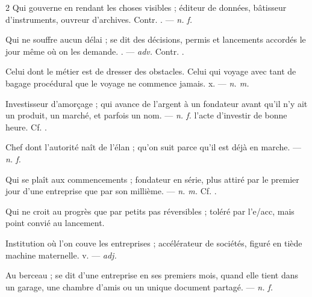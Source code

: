 \begin{multicols}{2}
 Qui gouverne en rendant les choses visibles ; éditeur de données, bâtisseur d'instruments, ouvreur d'archives. Contr. . —  \textit{n. f.}

 Qui ne souffre aucun délai ; se dit des décisions, permis et lancements accordés le jour même où on les demande. . —  \textit{adv.} Contr. .

  Celui dont le métier est de dresser des obstacles.  Celui qui voyage avec tant de bagage procédural que le voyage ne commence jamais.   x. —  \textit{n. m.}

 Investisseur d'amorçage ; qui avance de l'argent à un fondateur avant qu'il n'y ait un produit, un marché, et parfois un nom. —  \textit{n. f.} l'acte d'investir de bonne heure. Cf. .

 Chef dont l'autorité naît de l'élan ; qu'on suit parce qu'il est déjà en marche. —  \textit{n. f.}

 Qui se plaît aux commencements ; fondateur en série, plus attiré par le premier jour d'une entreprise que par son millième. —  \textit{n. m.} Cf. .

 Qui ne croit au progrès que par petits pas réversibles ; toléré par l'e/acc, mais point convié au lancement.

 Institution où l'on couve les entreprises ; accélérateur de sociétés, figuré en tiède machine maternelle.   v. —  \textit{adj.}

 Au berceau ; se dit d'une entreprise en ses premiers mois, quand elle tient dans un garage, une chambre d'amis ou un unique document partagé.   —  \textit{n. f.}


\end{multicols}
